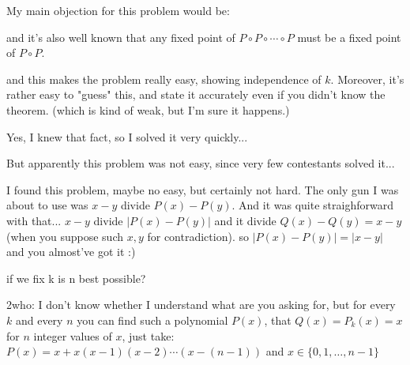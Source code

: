 \begin{solution}
	My main objection for this problem would be:\begin{tcolorbox}and it's also well known that any fixed point of $P \circ P \circ \cdots \circ P$ must be a fixed point of $P \circ P$.\end{tcolorbox}and this makes the problem really easy, showing independence of $k$. Moreover, it's rather easy to "guess" this, and state it accurately even if you didn't know the theorem. (which is kind of weak, but I'm sure it happens.)
\end{solution}



\begin{solution}
	Yes, I knew that fact, so I solved it very quickly...

But apparently this problem was not easy, since very few contestants solved it...
\end{solution}



\begin{solution}
	I found this problem, maybe no easy, but certainly not hard. The only gun I was about to use was $x-y$ divide $P(x)-P(y)$. And it was quite straighforward with that... $x-y$ divide $|P(x)-P(y)|$ and it divide $Q(x)-Q(y)=x-y$ (when you suppose such $x,y$ for contradiction). so $|P(x)-P(y)|=|x-y|$ and you almost've got it :)
\end{solution}



\begin{solution}
	if we fix k is n best possible?
\end{solution}



\begin{solution}
	2who: I don't know whether I understand what are you asking for, but for every $k$ and every $n$ you can find such a polynomial $P(x)$, that $Q(x)=P_{k}(x)=x$ for $n$ integer values of $x$, just take: $P(x)=x+x(x-1)(x-2)\cdots(x-(n-1))$ and $x\in\{0,1,\ldots,n-1\}$
\end{solution}




